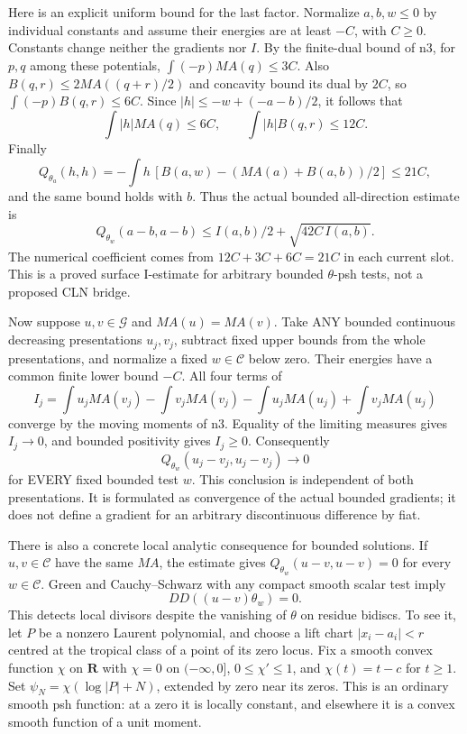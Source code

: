 \documentclass[11pt]{article}
\begin{document}
Here is an explicit uniform bound for the last factor. Normalize $a,b,w\le0$ by individual constants and assume their energies are at least $-C$, with $C\ge0$. Constants change neither the gradients nor $I$. By the finite-dual bound of n3, for $p,q$ among these potentials, $\int(-p)MA(q)\le3C$. Also $B(q,r)\le2MA((q+r)/2)$ and concavity bound its dual by $2C$, so $\int(-p)B(q,r)\le6C$. Since $|h|\le -w+(-a-b)/2$, it follows that
\[
 \int|h|MA(q)\le6C,\qquad\int|h|B(q,r)\le12C.
\]
Finally
\[
 Q_{\theta_a}(h,h)
 =-\int h\,[B(a,w)-(MA(a)+B(a,b))/2]\le21C,
\]
and the same bound holds with $b$. Thus the actual bounded all-direction estimate is
\[
 \boxed{Q_{\theta_w}(a-b,a-b)\le I(a,b)/2+\sqrt{42C\,I(a,b)}}.
\]
The numerical coefficient comes from $12C+3C+6C=21C$ in each current slot. This is a proved surface I-estimate for arbitrary bounded $\theta$-psh tests, not a proposed CLN bridge.

Now suppose $u,v\in\mathcal G$ and $MA(u)=MA(v)$. Take ANY bounded continuous decreasing presentations $u_j,v_j$, subtract fixed upper bounds from the whole presentations, and normalize a fixed $w\in\mathcal C$ below zero. Their energies have a common finite lower bound $-C$. All four terms of
\[
 I_j=\int u_jMA(v_j)-\int v_jMA(v_j)
 -\int u_jMA(u_j)+\int v_jMA(u_j)
\]
converge by the moving moments of n3. Equality of the limiting measures gives $I_j\to0$, and bounded positivity gives $I_j\ge0$. Consequently
\[
 Q_{\theta_w}(u_j-v_j,u_j-v_j)\longrightarrow0
\]
for EVERY fixed bounded test $w$. This conclusion is independent of both presentations. It is formulated as convergence of the actual bounded gradients; it does not define a gradient for an arbitrary discontinuous difference by fiat.

There is also a concrete local analytic consequence for bounded solutions. If $u,v\in\mathcal C$ have the same $MA$, the estimate gives $Q_{\theta_w}(u-v,u-v)=0$ for every $w\in\mathcal C$. Green and Cauchy--Schwarz with any compact smooth scalar test imply
\[
 DD((u-v)\theta_w)=0.
\]
This detects local divisors despite the vanishing of $\theta$ on residue bidiscs. To see it, let $P$ be a nonzero Laurent polynomial, and choose a lift chart $|x_i-a_i|<r$ centred at the tropical class of a point of its zero locus. Fix a smooth convex function $\chi$ on $\mathbf R$ with $\chi=0$ on $(-\infty,0]$, $0\le\chi'\le1$, and $\chi(t)=t-c$ for $t\ge1$. Set $\psi_N=\chi(\log|P|+N)$, extended by zero near its zeros. This is an ordinary smooth psh function: at a zero it is locally constant, and elsewhere it is a convex smooth function of a unit moment.
\end{document}
